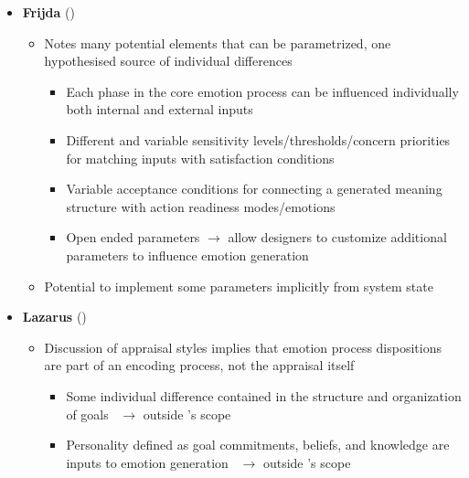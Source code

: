 \begin{itemize}
    \item \textbf{Frijda} (\strong)
    \begin{itemize}
        \item Notes many potential elements that can be parametrized, one
        hypothesised source of individual
        differences~\citep[p.~456--458]{frijda1986emotions}
        \begin{itemize}
            \item Each phase in the core emotion process can be influenced
            individually both internal and external inputs

            \item Different and variable sensitivity levels/thresholds/concern
            priorities for matching inputs with satisfaction conditions

            \item Variable acceptance conditions for connecting a generated
            meaning structure with action readiness modes/emotions

            \item Open ended parameters $\rightarrow$ allow designers to
            customize additional parameters to influence emotion generation
        \end{itemize}

        \item Potential to implement some parameters implicitly from system
        state
    \end{itemize}

    \item \textbf{Lazarus} (\disqualified)
    \begin{itemize}
        \item Discussion of appraisal styles implies that emotion process
        dispositions are part of an encoding process, not the appraisal
        itself~\citep[p.~138]{lazarus1991emotion}
        \begin{itemize}
            \item Some individual difference contained in the structure and
            organization of goals~\citep[p.~99]{lazarus1991emotion}
            $\rightarrow$ outside \progname{}'s scope

            \item Personality defined as goal commitments, beliefs, and
            knowledge are inputs to emotion
            generation~\citep[p.~209]{lazarus1991emotion} $\rightarrow$ outside
            \progname{}'s scope


\end{itemize}
\end{itemize}
\end{itemize}
